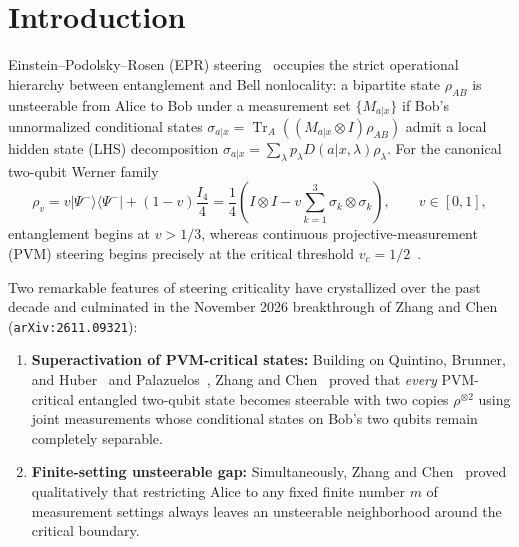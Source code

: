 \documentclass[11pt,a4paper]{article}
\theoremstyle{definition}
\theoremstyle{remark}
\newcommand{\Tr}{\operatorname{Tr}}
\begin{document}
\section{Introduction}

Einstein--Podolsky--Rosen (EPR) steering~\cite{wiseman2007steering,cavalcanti2017quantum,uola2020quantum} occupies the strict operational hierarchy between entanglement and Bell nonlocality: a bipartite state $\rho_{AB}$ is unsteerable from Alice to Bob under a measurement set $\{M_{a|x}\}$ if Bob's unnormalized conditional states $\sigma_{a|x} = \Tr_A((M_{a|x} \otimes I)\rho_{AB})$ admit a local hidden state (LHS) decomposition $\sigma_{a|x} = \sum_\lambda p_\lambda D(a|x,\lambda)\rho_\lambda$. For the canonical two-qubit Werner family~\cite{werner1989quantum}
\begin{equation}
  \rho_v = v|\Psi^-\rangle\langle\Psi^-| + (1-v)\frac{I_4}{4}
         = \frac{1}{4}\!\left(I\otimes I - v\sum_{k=1}^3 \sigma_k \otimes \sigma_k\right),
  \qquad v \in [0, 1],
\end{equation}
entanglement begins at $v > 1/3$, whereas continuous projective-measurement (PVM) steering begins precisely at the critical threshold $v_c = 1/2$~\cite{wiseman2007steering}.

Two remarkable features of steering criticality have crystallized over the past decade and culminated in the November 2026 breakthrough of Zhang and Chen~\cite{zhang2026critical} (\texttt{arXiv:2611.09321}):
\begin{enumerate}[leftmargin=1.8em,itemsep=2pt]
  \item \textbf{Superactivation of PVM-critical states:} Building on Quintino, Brunner, and Huber~\cite{quintino2016superactivation} and Palazuelos~\cite{palazuelos2012superactivation}, Zhang and Chen~\cite{zhang2026critical} proved that \emph{every} PVM-critical entangled two-qubit state becomes steerable with two copies $\rho^{\otimes 2}$ using joint measurements whose conditional states on Bob's two qubits remain completely separable.
  \item \textbf{Finite-setting unsteerable gap:} Simultaneously, Zhang and Chen~\cite{zhang2026critical} proved qualitatively that restricting Alice to any fixed finite number $m$ of measurement settings always leaves an unsteerable neighborhood around the critical boundary.
\end{enumerate}
\end{document}
